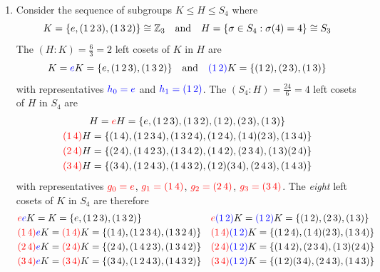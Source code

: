 \begin{examples}{}{}
\begin{enumerate}
		\item Consider the sequence of subgroups $K\le H\le S_4$ where
		\[
			K=\{e,(1\,2\,3),(1\,3\,2)\}\cong\mathbb{Z}_3
			\quad\text{and}\quad 
			H=\{\sigma\in S_4:\sigma(4)=4\}\cong S_3
		\]
		The $(H:K)=\frac 63=2$ left cosets of $K$ in $H$ are
		\[
			K=\textcolor{blue}{e}K=\{e,(1\,2\,3),(1\,3\,2)\}
			\quad\text{and}\quad 
			\textcolor{blue}{(1\,2)}K=\{(1\,2),(2\,3),(1\,3)\}
		\]
		with representatives $\textcolor{blue}{h_0=e}$ and $\textcolor{blue}{h_1=(1\,2)}$. The $(S_4:H)=\frac{24}6=4$ left cosets of $H$ in $S_4$ are
		\begin{gather*}
			H=\textcolor{red}{e}H=\{e,(1\,2\,3),(1\,3\,2),(1\,2),(2\,3),(1\,3)\}\\
			\textcolor{red}{(1\,4)}H=\{(1\,4),(1\,2\,3\,4),(1\,3\,2\,4),(1\,2\,4),(1\,4)(2\,3),(1\,3\,4)\}\\
			\textcolor{red}{(2\,4)}H=\{(2\,4),(1\,4\,2\,3),(1\,3\,4\,2),(1\,4\,2),(2\,3\,4),(1\,3)(2\,4)\}\\
			\textcolor{red}{(3\,4)}H=\{(3\,4),(1\,2\,4\,3),(1\,4\,3\,2),(1\,2)(3\,4),(2\,4\,3),(1\,4\,3)\}
		\end{gather*}
		with representatives $\textcolor{red}{g_0=e}$, $\textcolor{red}{g_1=(1\,4)}$, $\textcolor{red}{g_2=(2\,4)}$, $\textcolor{red}{g_3=(3\,4)}$. The \emph{eight} left cosets of $K$ in $S_4$ are therefore
		\begin{align*}
			&\textcolor{red}{e}\textcolor{blue}{e}K=K=\{e,(1\,2\,3),(1\,3\,2)\}&&\textcolor{red}{e}\textcolor{blue}{(1\,2)}K=\textcolor{blue}{(1\,2)}K=\{(1\,2),(2\,3),(1\,3)\}\\
			&\textcolor{red}{(1\,4)}\textcolor{blue}{e}K=\textcolor{red}{(1\,4)}K=\{(1\,4),(1\,2\,3\,4),(1\,3\,2\,4)\}&&\textcolor{red}{(1\,4)}\textcolor{blue}{(1\,2)}K=\{(1\,2\,4),(1\,4)(2\,3),(1\,3\,4)\}\\
			&\textcolor{red}{(2\,4)}\textcolor{blue}{e}K=\textcolor{red}{(2\,4)}K=\{(2\,4),(1\,4\,2\,3),(1\,3\,4\,2)\}&&\textcolor{red}{(2\,4)}\textcolor{blue}{(1\,2)}K=\{(1\,4\,2),(2\,3\,4),(1\,3)(2\,4)\}\\
			&\textcolor{red}{(3\,4)}\textcolor{blue}{e}K=\textcolor{red}{(3\,4)}K=\{(3\,4),(1\,2\,4\,3),(1\,4\,3\,2)\}&&\textcolor{red}{(3\,4)}\textcolor{blue}{(1\,2)}K=\{(1\,2)(3\,4),(2\,4\,3),(1\,4\,3)\}
		\end{align*}
	\end{enumerate}
\end{examples}


\goodbreak



